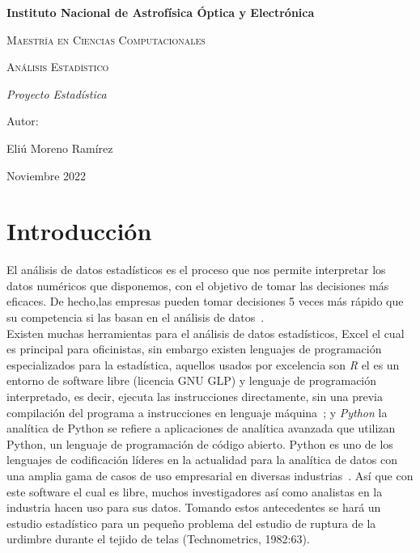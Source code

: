 \documentclass{report}
\begin{document}
%

\begin{titlepage}
\centering
{\bfseries\LARGE Instituto Nacional de Astrofísica Óptica y Electrónica \par}
\vspace{1cm}
{\scshape\Large Maestría en Ciencias Computacionales \par}
\vspace{3cm}
{\scshape\Huge Análisis Estadístico  \par}
\vspace{3cm}
{\itshape\Large Proyecto Estadística \par}
\vfill
{\Large Autor: \par}
{\Large Eliú Moreno Ramírez\par}
\vfill
{\Large Noviembre 2022 \par}
\end{titlepage}
%

%
%
%
\section{Introducción}
El análisis de datos estadísticos es el proceso que nos permite interpretar los datos numéricos que disponemos, con el objetivo de tomar las decisiones más eficaces. De hecho,las empresas pueden tomar decisiones 5 veces más rápido que su competencia si las basan en el análisis de datos~\cite{ref_article0}.\\
Existen muchas herramientas para el análisis de datos estadísticos, Excel el cual es principal para oficinistas, sin embargo existen lenguajes de programación especializados para la estadística, aquellos usados por excelencia son \textit{R} el es un entorno de software libre (licencia GNU GLP) y lenguaje de programación interpretado, es decir, ejecuta las instrucciones directamente, sin una previa compilación del programa a instrucciones en lenguaje máquina~\cite{ref_article1}; y \textit{Python} la analítica de Python se refiere a aplicaciones de analítica avanzada que utilizan Python, un lenguaje de programación de código abierto. Python es uno de los lenguajes de codificación líderes en la actualidad para la analítica de datos con una amplia gama de casos de uso empresarial en diversas industrias~\cite{ref_article2}.
Así que con este software el cual es libre, muchos investigadores así como analistas en la industria hacen uso para sus datos. Tomando estos antecedentes se hará un estudio estadístico para un pequeño problema del estudio de ruptura de la urdimbre durante el tejido de telas (Technometrics, 1982:63).
\end{document}
